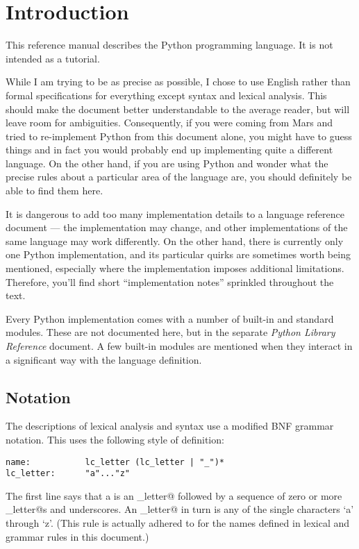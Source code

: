 \chapter{Introduction}

This reference manual describes the Python programming language.
It is not intended as a tutorial.

While I am trying to be as precise as possible, I chose to use English
rather than formal specifications for everything except syntax and
lexical analysis.  This should make the document better understandable
to the average reader, but will leave room for ambiguities.
Consequently, if you were coming from Mars and tried to re-implement
Python from this document alone, you might have to guess things and in
fact you would probably end up implementing quite a different language.
On the other hand, if you are using
Python and wonder what the precise rules about a particular area of
the language are, you should definitely be able to find them here.

It is dangerous to add too many implementation details to a language
reference document --- the implementation may change, and other
implementations of the same language may work differently.  On the
other hand, there is currently only one Python implementation, and
its particular quirks are sometimes worth being mentioned, especially
where the implementation imposes additional limitations.  Therefore,
you'll find short ``implementation notes'' sprinkled throughout the
text.

Every Python implementation comes with a number of built-in and
standard modules.  These are not documented here, but in the separate
{\em Python Library Reference} document.  A few built-in modules are
mentioned when they interact in a significant way with the language
definition.

\section{Notation}

The descriptions of lexical analysis and syntax use a modified BNF
grammar notation.  This uses the following style of definition:

\begin{verbatim}
name:           lc_letter (lc_letter | "_")*
lc_letter:      "a"..."z"
\end{verbatim}

The first line says that a \verb@name@ is an \verb@lc_letter@ followed by
a sequence of zero or more \verb@lc_letter@s and underscores.  An
\verb@lc_letter@ in turn is any of the single characters `a' through `z'.
(This rule is actually adhered to for the names defined in lexical and
grammar rules in this document.)

